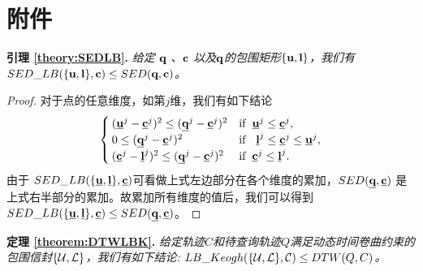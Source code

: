 \section{附件}\label{sec-c5-Appendix}
\textbf{引理 \ref{theory:SEDLB}. }{\em 给定 $\bq$ 、$\bc$ 以及$\bq$的包围矩形$\{\bu, \bl\}$，我们有
	$SED\_LB(\{{\bu},\bl \},\bc)\le SED(\bq,\bc)$。}

\begin{proof}
	对于点的任意维度，如第$j$维，我们有如下结论
	\begin{equation}
	\begin{cases}
	({\vu}^{j}- {\vc}^{j})^2 \le  ({\vq}^{j}- {\vc}^{j})^2     & {\rm if}   \,\,\,    \vu^{j} \le {\vc}^{j},\\
	0 \le  ({\vq}^{j}- {\vc}^{j})^2   & {\rm if}  \,\,\,   \  \vl^{j} \le  {\vc}^{j} \le \vu^{j},\\
	({\vc}^{j} -{\vl}^{j})^2 \le  ({\vq}^{j}- {\vc}^{j})^2  &{\rm if}  \,\,\,    {\vc}^{j} \le \vl^{j}.
	\end{cases}
	\end{equation}
	由于	$SED\_LB(\{{\vu},\vl \},\vc)$可看做上式左边部分在各个维度的累加，$SED(\vq,\vc)$ 是上式右半部分的累加。故累加所有维度的值后，我们可以得到$SED\_LB(\{{\vu},\vl \},\vc)\le SED(\vq,\vc)$。
\end{proof}

\textbf{定理 \ref{theorem:DTWLBK}. }{\em 给定轨迹$C$和待查询轨迹$Q$满足动态时间卷曲约束的包围信封$\{{\cal U}, {\cal L}\}$，我们有如下结论: $LB\_Keogh({\{\cal U,\cal L\},{\cal C}}) \le DTW(Q,C)$。}

